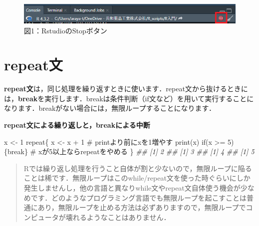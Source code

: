 \documentclass[
  letterpaper,
  DIV=11,
  numbers=noendperiod]{scrreprt}
\newenvironment{Shaded}{\begin{snugshade}}{\end{snugshade}}
\newcommand{\CommentTok}[1]{\textcolor[rgb]{0.37,0.37,0.37}{#1}}
\newcommand{\ControlFlowTok}[1]{\textcolor[rgb]{0.00,0.23,0.31}{#1}}
\newcommand{\DecValTok}[1]{\textcolor[rgb]{0.68,0.00,0.00}{#1}}
\newcommand{\DocumentationTok}[1]{\textcolor[rgb]{0.37,0.37,0.37}{\textit{#1}}}
\newcommand{\FunctionTok}[1]{\textcolor[rgb]{0.28,0.35,0.67}{#1}}
\newcommand{\NormalTok}[1]{\textcolor[rgb]{0.00,0.23,0.31}{#1}}
\newcommand{\OtherTok}[1]{\textcolor[rgb]{0.00,0.23,0.31}{#1}}
\newcommand{\SpecialCharTok}[1]{\textcolor[rgb]{0.37,0.37,0.37}{#1}}
\begin{document}
\begin{figure}

{\centering \includegraphics{././image/stop_button.png}

}

\caption{図1：RstudioのStopボタン}

\end{figure}

\hypertarget{repeatux6587}{%
\section{repeat文}\label{repeatux6587}}

\textbf{repeat文}は，同じ処理を繰り返すときに使います．repeat文から抜けるときには，\textbf{break}を実行します．breakは条件判断（if文など）を用いて実行することになります．breakがない場合には，無限ループすることになります．

\textbf{repeat文による繰り返しと，breakによる中断}

\begin{Shaded}
\begin{Highlighting}[]
\NormalTok{x }\OtherTok{\textless{}{-}} \DecValTok{1}
\ControlFlowTok{repeat}\NormalTok{\{}
\NormalTok{  x }\OtherTok{\textless{}{-}}\NormalTok{ x }\SpecialCharTok{+} \DecValTok{1} \CommentTok{\# printより前にxを1増やす}
  \FunctionTok{print}\NormalTok{(x)}
  \ControlFlowTok{if}\NormalTok{(x }\SpecialCharTok{\textgreater{}=} \DecValTok{5}\NormalTok{)\{}\ControlFlowTok{break}\NormalTok{\} }\CommentTok{\# xが5以上ならrepeatをやめる}
\NormalTok{\}}
\DocumentationTok{\#\# [1] 2}
\DocumentationTok{\#\# [1] 3}
\DocumentationTok{\#\# [1] 4}
\DocumentationTok{\#\# [1] 5}
\end{Highlighting}
\end{Shaded}

\begin{quote}
Rでは繰り返し処理を行うこと自体が割と少ないので，無限ループに陥ることは稀です．無限ループはこのwhile/repeat文を使った時ぐらいにしか発生しませんし，他の言語と異なりwhile文やrepeat文自体使う機会が少なめです．どのようなプログラミング言語でも無限ループを起こすことは普通にあり，無限ループを止める方法は必ずありますので，無限ループでコンピュータが壊れるようなことはありません．
\end{quote}

\end{document}
